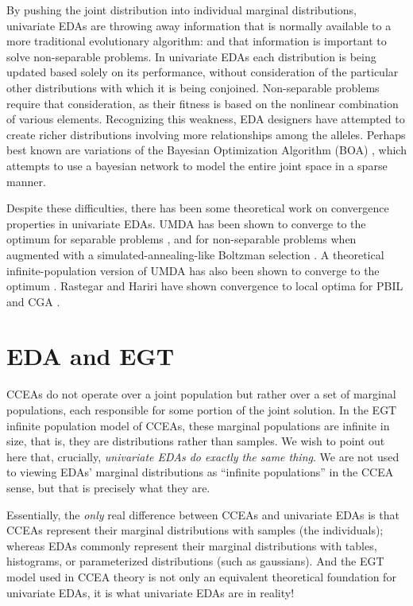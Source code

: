 \documentclass{acm_proc_article-sp}
\begin{document}
By pushing the joint distribution into individual marginal distributions, univariate EDAs are throwing away information that is normally available to a more traditional evolutionary algorithm: and that information is important to solve non-separable problems.  In univariate EDAs each distribution is being updated based solely on its performance, without consideration of the particular other distributions with which it is being conjoined.  Non-separable problems require that consideration, as their fitness is based on the nonlinear combination of various elements.  Recognizing this weakness, EDA designers have attempted to create richer distributions involving more relationships among the alleles.  Perhaps best known are variations of the Bayesian Optimization Algorithm (BOA) \cite{pelikan99boa,hboa}, which attempts to use a bayesian network to model the entire joint space in a sparse manner.

Despite these difficulties, there has been some theoretical work on convergence properties in univariate EDAs.  UMDA has been shown to converge to the optimum for separable problems \cite{MuehlenbeinManig1999JCIT}, and for non-separable problems when augmented with a simulated-annealing-like Boltzman selection \cite{Muhlenbein99schemata,MuehlenbeinMahnig1999ECJ}.  A theoretical infinite-population version of UMDA has also been shown to converge to the optimum \cite{Zhang2004,ZhangMuehlenbein2004}.  Rastegar and Hariri have shown convergence to local optima for PBIL \cite{pbilconverge} and CGA \cite{cgaconverge}.


\section{EDA and EGT}

CCEAs do not operate over a joint population but rather over a set of marginal populations, each responsible for some portion of the joint solution.  In the EGT infinite population model of CCEAs, these marginal populations are infinite in size, that is, they are distributions rather than samples.  We wish to point out here that, crucially, {\it univariate EDAs do exactly the same thing}.  We are not used to viewing EDAs' marginal distributions as ``infinite populations'' in the CCEA sense, but that is precisely what they are.

Essentially, the {\it only} real difference between CCEAs and univariate EDAs is that CCEAs represent their marginal distributions with samples (the individuals); whereas EDAs commonly represent their marginal distributions with tables, histograms, or parameterized distributions (such as gaussians).  And the EGT model used in CCEA theory is not only an equivalent theoretical foundation for univariate EDAs, it is what univariate EDAs are in reality!
\end{document}
